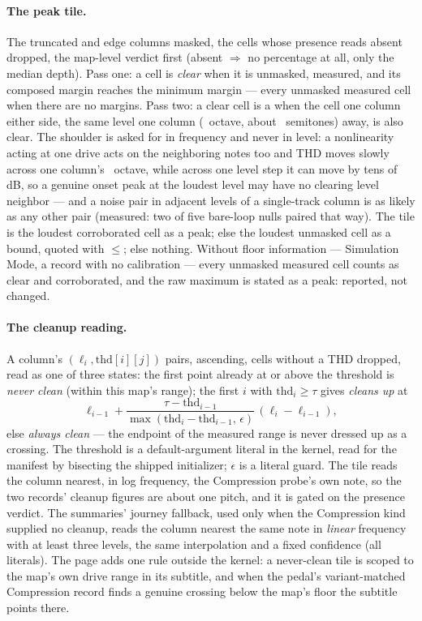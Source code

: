 \documentclass[11pt,a4paper]{article}
\begin{document}
\paragraph{The peak tile.} The truncated and edge columns masked, the
cells whose presence reads absent dropped, the map-level verdict first
(absent $\Rightarrow$ no percentage at all, only the median depth). Pass
one: a cell is \emph{clear} when it is unmasked, measured, and its
composed margin reaches the minimum margin --- every unmasked measured
cell when there are no margins. Pass two: a clear cell is a
 when the cell one column either side, the same
level one column (\journeyColumnOctaves\ octave, about
\journeyColumnSemitones\ semitones) away, is also clear. The shoulder is
asked for in frequency and never in level: a nonlinearity acting at one
drive acts on the neighboring notes too and THD moves slowly across one
column's \journeyColumnOctaves\ octave, while across one level step it
can move by tens of dB, so a
genuine onset peak at the loudest level may have no clearing level
neighbor --- and a noise pair in adjacent levels of a single-track column
is as likely as any other pair (measured: two of five bare-loop nulls
paired that way). The tile is the loudest corroborated cell as a peak; else
the loudest unmasked cell as a bound, quoted with $\le$; else nothing.
Without floor information --- Simulation Mode, a record with no
calibration --- every unmasked measured cell counts as clear and
corroborated, and the raw maximum is stated as a peak: reported, not
changed.

\paragraph{The cleanup reading.} A column's $(\ell_i, \mathrm{thd}[i][j])$
pairs, ascending, cells without a THD dropped, read as one of three
states: the first point already at or above the threshold is
\emph{never clean} (within this map's range); the first $i$ with
$\mathrm{thd}_i \ge \tau$ gives \emph{cleans up} at
\begin{equation}
  \ell_{i-1} + \frac{\tau - \mathrm{thd}_{i-1}}{\max(\mathrm{thd}_i - \mathrm{thd}_{i-1},\, \epsilon)}\,(\ell_i - \ell_{i-1}),
  \label{eq:crossing}
\end{equation}
else \emph{always clean} --- the endpoint of the measured range is never
dressed up as a crossing. The threshold is a default-argument literal in
the kernel, read for the manifest by bisecting the shipped initializer;
$\epsilon$ is a literal guard. The tile reads the column nearest, in log
frequency, the Compression probe's own note, so the two records' cleanup
figures are about one pitch, and it is gated on the presence verdict. The
summaries' journey fallback, used only when the Compression kind supplied
no cleanup, reads the column nearest the same note in \emph{linear}
frequency with at least three levels, the same interpolation and a fixed
confidence (all literals). The page adds one rule outside the kernel: a
never-clean tile is scoped to the map's own drive range in its subtitle,
and when the pedal's variant-matched Compression record finds a genuine
crossing below the map's floor the subtitle points there.
\end{document}
